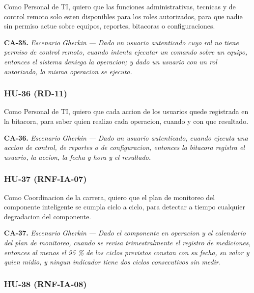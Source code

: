
Como Personal de TI, quiero que las funciones administrativas, tecnicas y de control remoto solo esten disponibles para los roles autorizados, para que nadie sin permiso actue sobre equipos, reportes, bitacoras o configuraciones.


\textbf{CA-35.} \textit{Escenario }\textit{Gherkin}\textit{ --- Dado un usuario autenticado cuyo rol no tiene permiso de control remoto, cuando intenta ejecutar un comando sobre un equipo, entonces el sistema deniega la operacion; y dado un usuario con un rol autorizado, la misma operacion se ejecuta.}

\subsubsection*{HU-36 (RD-11)}


Como Personal de TI, quiero que cada accion de los usuarios quede registrada en la bitacora, para saber quien realizo cada operacion, cuando y con que resultado.


\textbf{CA-36.} \textit{Escenario }\textit{Gherkin}\textit{ --- Dado un usuario autenticado, cuando ejecuta una accion de control, de reportes o de configuracion, entonces la bitacora registra el usuario, la accion, la fecha y hora y el resultado.}

\subsubsection*{HU-37 (RNF-IA-07)}


Como Coordinacion de la carrera, quiero que el plan de monitoreo del componente inteligente se cumpla ciclo a ciclo, para detectar a tiempo cualquier degradacion del componente.


\textbf{CA-37.} \textit{Escenario }\textit{Gherkin}\textit{ --- Dado el componente en operacion y el calendario del plan de monitoreo, cuando se revisa trimestralmente el registro de mediciones, entonces al menos el 95 \% de los ciclos previstos constan con su fecha, su valor y quien midio, y ningun indicador tiene dos ciclos consecutivos sin medir.}

\subsubsection*{HU-38 (RNF-IA-08)}

